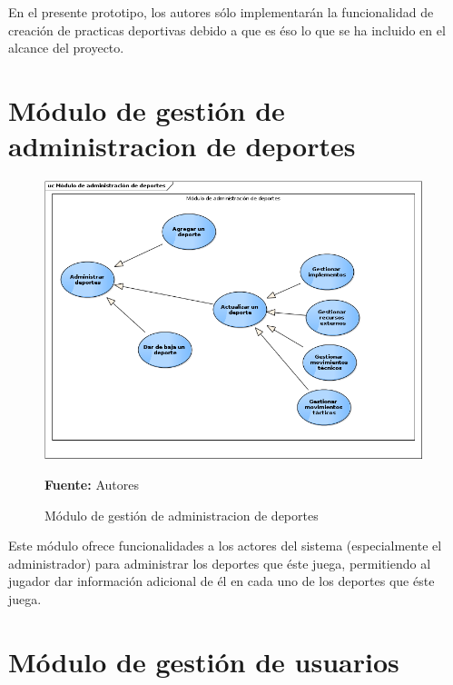 En el presente prototipo, los autores sólo implementarán la funcionalidad de creación de practicas deportivas debido a que es éso lo que se ha incluido en el alcance del proyecto.

\section{Módulo de gestión de administracion de deportes}

\begin{figure}[!htb]
  \begin{center}
    \includegraphics[width=11cm]{./imagenes/casos_uso/administracion_deportes.png}
    \caption{Módulo de gestión de administracion de deportes}
    \label{fig:cu_admin_dep}
    \textbf{Fuente:} Autores \\
  \end{center}
\end{figure}

Este módulo ofrece funcionalidades a los actores del sistema (especialmente el administrador) para administrar los deportes que éste juega, permitiendo al jugador dar información adicional de él en cada uno de los deportes que éste juega.

\section{Módulo de gestión de usuarios}

